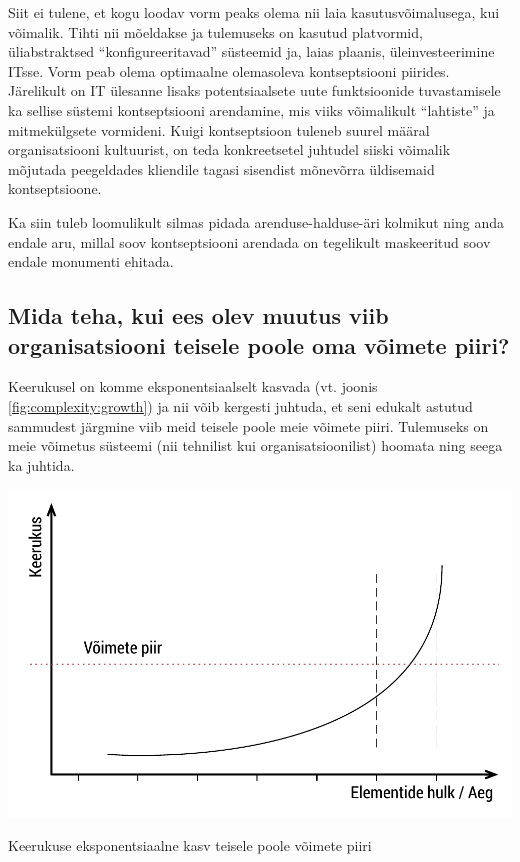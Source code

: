 \documentclass{tufte-book}
\begin{document}
Siit ei tulene, et kogu loodav vorm peaks olema nii laia kasutusvõimalusega, kui võimalik. Tihti nii mõeldakse ja tulemuseks on kasutud platvormid, üliabstraktsed \enquote{konfigureeritavad} süsteemid ja, laias plaanis, üleinvesteerimine ITsse. Vorm peab olema optimaalne olemasoleva kontseptsiooni piirides. Järelikult on IT ülesanne lisaks potentsiaalsete uute funktsioonide tuvastamisele ka sellise süstemi kontseptsiooni arendamine, mis viiks võimalikult \enquote{lahtiste} ja mitmekülgsete vormideni. Kuigi kontseptsioon tuleneb suurel määral organisatsiooni kultuurist, on teda konkreetsetel juhtudel siiski võimalik mõjutada peegeldades kliendile tagasi sisendist mõnevõrra üldisemaid kontseptsioone. 

Ka siin tuleb loomulikult silmas pidada arenduse-halduse-äri kolmikut ning anda endale aru, millal soov kontseptsiooni arendada on tegelikult maskeeritud soov endale monumenti ehitada.

\subsection{Mida teha, kui ees olev muutus viib organisatsiooni teisele poole oma võimete piiri?}
Keerukusel on komme eksponentsiaalselt kasvada (vt. joonis \ref{fig:complexity:growth}) ja nii võib kergesti juhtuda, et seni edukalt astutud sammudest järgmine viib meid teisele poole meie võimete piiri. Tulemuseks on meie võimetus süsteemi (nii tehnilist kui organisatsioonilist) hoomata ning seega ka juhtida. 

\begin{marginfigure}
		\includegraphics[width=\linewidth]{keerukus.pdf}
		\caption{Keerukuse eksponentsiaalne kasv teisele poole võimete piiri}
		\label{fig:complexity:growth}
\end{marginfigure}
\end{document}
